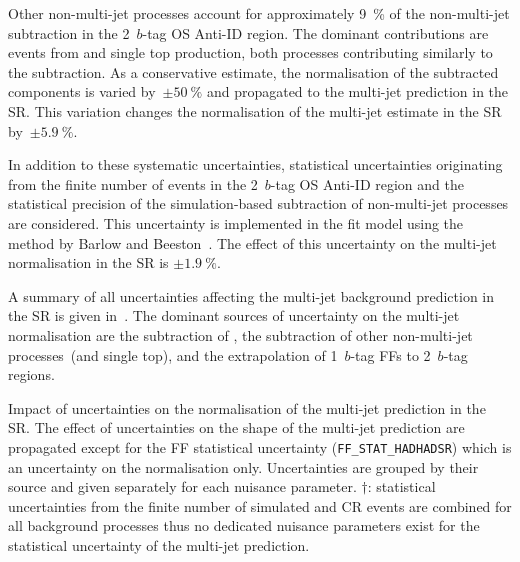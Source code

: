Other non-multi-jet processes account for approximately \SI{9}{\percent} of the
non-multi-jet subtraction in the 2~$b$-tag OS Anti-ID region. The dominant
contributions are events from \Vjets and single top production, both processes
contributing similarly to the subtraction. As a conservative estimate, the
normalisation of the subtracted components is varied by~$\pm \SI{50}{\percent}$
and propagated to the multi-jet prediction in the SR. This variation changes the
normalisation of the multi-jet estimate in the SR by~$\pm\SI{5.9}{\percent}$.

In addition to these systematic uncertainties, statistical uncertainties
originating from the finite number of events in the 2~$b$-tag OS Anti-ID region
and the statistical precision of the simulation-based subtraction of
non-multi-jet processes are considered. This uncertainty is implemented in the
fit model using the method by Barlow and
Beeston~\cite{barlow1993,conway2011}. The effect of this uncertainty on the
multi-jet normalisation in the SR is $\pm \SI{1.9}{\percent}$.

A summary of all uncertainties affecting the multi-jet background prediction in
the SR is given in~. The dominant sources of
uncertainty on the multi-jet normalisation are the subtraction of \ttbarFakes,
the subtraction of other non-multi-jet processes~(\Vjets and single top), and
the extrapolation of 1~$b$-tag FFs to 2~$b$-tag regions.

\begin{table}[htbp]
  \centering

  \caption{Impact of uncertainties on the normalisation of the multi-jet
    prediction in the \hadhad SR. The effect of uncertainties on the shape of
    the multi-jet prediction are propagated except for the FF statistical
    uncertainty (\texttt{FF\_STAT\_HADHADSR}) which is an uncertainty on the
    normalisation only. Uncertainties are grouped by their source and given
    separately for each nuisance parameter. $\dagger$: statistical uncertainties
    from the finite number of simulated and CR events are combined for all
    background processes thus no dedicated nuisance parameters exist for the
    statistical uncertainty of the multi-jet prediction.}%
  \label{tab:multi_jet_uncertainties}

   \\
\end{table}




